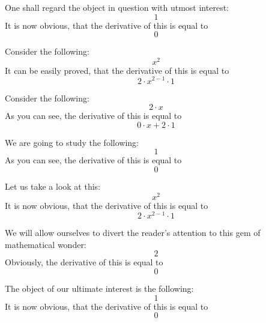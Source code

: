 \documentclass{article}
\begin{document}
One shall regard the object in question with utmost interest:
\begin{equation}
1 
\end{equation}
It is now obvious, that the derivative of this is equal to
\begin{equation}
0 
\end{equation}

Consider the following:
\begin{equation}
x ^{2 } 
\end{equation}
It can be easily proved, that the derivative of this is equal to
\begin{equation}
2 \cdot x ^{2 - 1 } \cdot 1 
\end{equation}

Consider the following:
\begin{equation}
2 \cdot x 
\end{equation}
As you can see, the derivative of this is equal to
\begin{equation}
0 \cdot x + 2 \cdot 1 
\end{equation}

We are going to study the following:
\begin{equation}
1 
\end{equation}
As you can see, the derivative of this is equal to
\begin{equation}
0 
\end{equation}

Let us take a look at this:
\begin{equation}
x ^{2 } 
\end{equation}
It is now obvious, that the derivative of this is equal to
\begin{equation}
2 \cdot x ^{2 - 1 } \cdot 1 
\end{equation}

We will allow ourselves to divert the reader's attention to this gem of mathematical wonder:
\begin{equation}
2 
\end{equation}
Obviously, the derivative of this is equal to
\begin{equation}
0 
\end{equation}

The object of our ultimate interest is the following:
\begin{equation}
1 
\end{equation}
It is now obvious, that the derivative of this is equal to
\begin{equation}
0 
\end{equation}
\end{document}
